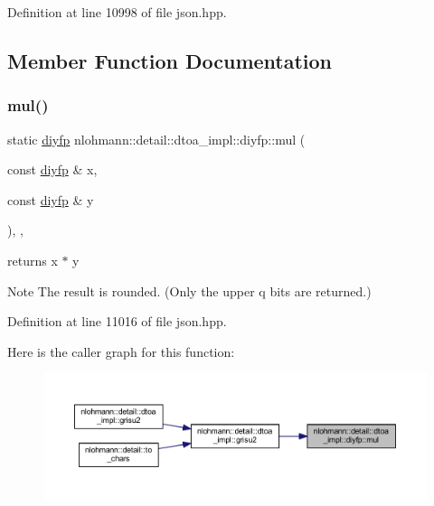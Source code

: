 Definition at line 10998 of file json.\+hpp.



\subsection{Member Function Documentation}
\mbox{\label{structnlohmann_1_1detail_1_1dtoa__impl_1_1diyfp_aa5f250d12ce89c81fdb08900c6a823e8}} 
\subsubsection{\texorpdfstring{mul()}{mul()}}
{\footnotesize\ttfamily static \mbox{\hyperlink{structnlohmann_1_1detail_1_1dtoa__impl_1_1diyfp}{diyfp}} nlohmann\+::detail\+::dtoa\+\_\+impl\+::diyfp\+::mul (\begin{DoxyParamCaption}\item[{const \mbox{\hyperlink{structnlohmann_1_1detail_1_1dtoa__impl_1_1diyfp}{diyfp}} \&}]{x,  }\item[{const \mbox{\hyperlink{structnlohmann_1_1detail_1_1dtoa__impl_1_1diyfp}{diyfp}} \&}]{y }\end{DoxyParamCaption})\hspace{0.3cm}{\ttfamily [inline]}, {\ttfamily [static]}, {\ttfamily [noexcept]}}



returns x $\ast$ y 

\begin{DoxyNote}{Note}
The result is rounded. (Only the upper q bits are returned.) 
\end{DoxyNote}


Definition at line 11016 of file json.\+hpp.

Here is the caller graph for this function\+:
\nopagebreak
\begin{figure}[H]
\begin{center}
\leavevmode
\includegraphics[width=350pt]{structnlohmann_1_1detail_1_1dtoa__impl_1_1diyfp_aa5f250d12ce89c81fdb08900c6a823e8_icgraph}
\end{center}
\end{figure}
\mbox{\label{structnlohmann_1_1detail_1_1dtoa__impl_1_1diyfp_a2246b5b40c7c6992153ef174063d6aa6}} 
